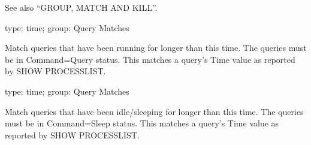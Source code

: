 \documentclass[letterpaper,10pt,english]{sphinxmanual}
\begin{document}
See also “GROUP, MATCH AND KILL”.

\begin{fulllineitems}
\label{\detokenize{mariadb-kill:cmdoption-mariadb-kill-busy-time}}
type: time; group: Query Matches

Match queries that have been running for longer than this time.  The queries
must be in Command=Query status.  This matches a query’s Time value as
reported by SHOW PROCESSLIST.

\end{fulllineitems}


\begin{fulllineitems}
\label{\detokenize{mariadb-kill:cmdoption-mariadb-kill-idle-time}}
type: time; group: Query Matches

Match queries that have been idle/sleeping for longer than this time.
The queries must be in Command=Sleep status.  This matches a query’s Time
value as reported by SHOW PROCESSLIST.

\end{fulllineitems}

\end{document}
